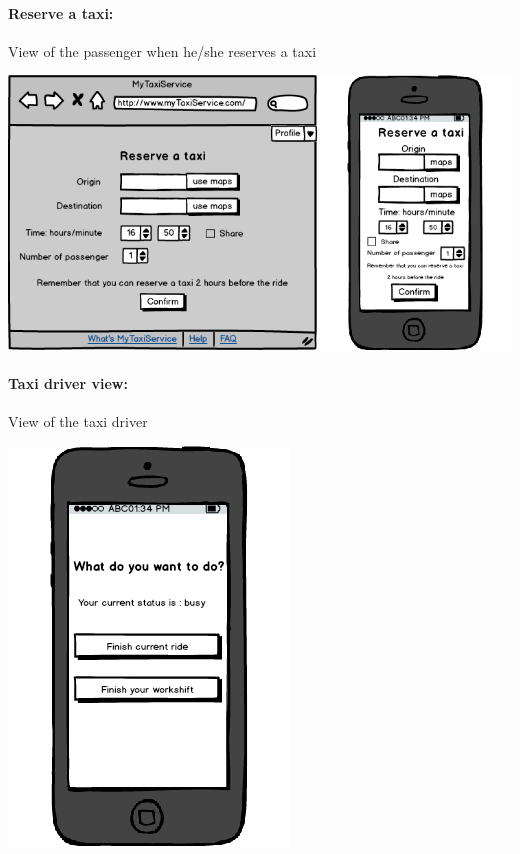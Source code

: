 \paragraph{Reserve a taxi:}
View of the passenger when he/she reserves a taxi
\begin{center}
	\includegraphics[width=\textwidth]{mockup/reserve.png}
\end{center}

\paragraph{Taxi driver view:}
View of the taxi driver
\begin{center}
	\includegraphics[scale=0.5]{mockup/taxiDriverFunctions.png}
\end{center}
\newpage
